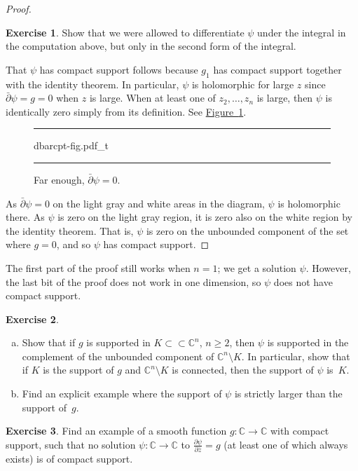 \documentclass[12pt,openany]{book}
\newcommand{\C}{{\mathbb{C}}}
\theoremstyle{plain}
\theoremstyle{remark}
\theoremstyle{definition}
\newenvironment{exbox}{%
    \def\FrameCommand{\vrule width 1pt \relax\hspace{10pt}}%
    \MakeFramed{\advance\hsize-\width\FrameRestore}%
}{%
    \endMakeFramed
}
\newenvironment{exparts}{%
    \leavevmode\begin{enumerate}[a),noitemsep,topsep=0pt,parsep=0pt,partopsep=0pt]
}{%
    \end{enumerate}
}
\newenvironment{myfig}{%
\begin{figure}[h!t]
\noindent\rule{\textwidth}{0.5pt}\vspace{12pt}\par\centering}%
{\par\noindent\rule{\textwidth}{0.5pt}
\end{figure}}
\theoremstyle{exercise}
\newtheorem{exercise}{Exercise}[section]
\theoremstyle{example}
\newcommand{\figureref}[1]{\hyperref[#1]{Figure~\ref*{#1}}}
\begin{document}
\begin{proof}
\begin{exbox}
\begin{exercise}
Show that we were allowed to differentiate $\psi$
under the integral in the computation above, but only in the second form
of the integral.
\end{exercise}
\end{exbox}

That $\psi$ has compact support follows because $g_1$ has compact
support together with the identity theorem.  In particular, $\psi$ is
holomorphic for large $z$ since $\bar{\partial} \psi = g = 0$ when $z$
is large.  When at least one of $z_2,\ldots,z_n$ is large,
then $\psi$ is identically zero
simply from its definition.  See \figureref{fig:dbarcpt-fig}.

\begin{myfig}
{dbarcpt-fig.pdf_t}
\caption{Far enough, $\bar{\partial} \psi = 0$.\label{fig:dbarcpt-fig}}
\end{myfig}

As $\bar{\partial} \psi = 0$ on the light gray and white areas in the
diagram, $\psi$ is holomorphic there. As $\psi$ is zero on the light
gray region, it is zero also on the white region by the identity theorem.
That is, $\psi$ is zero on the unbounded component of the set where $g=0$,
and so $\psi$ has compact support.
\end{proof}

The first part of the proof still works when $n=1$; we get a solution
$\psi$.  However, the last bit of the proof does not work in one dimension, so
$\psi$ does not have compact support.

\begin{exbox}
\begin{exercise} \label{exercise:supportofpsi}
\begin{exparts}
\item
Show that if $g$ is supported in $K \subset \subset \C^n$, $n \geq 2$,
then $\psi$ is supported in the complement of the unbounded component
of $\C^n \setminus K$.  In particular, show that if $K$ is the support of
$g$ and $\C^n \setminus K$ is connected, then the support of
$\psi$ is~$K$.
\item
Find an explicit example where the support of $\psi$ is strictly larger
than the support of~$g$.
\end{exparts}
\end{exercise}

\begin{exercise}
Find an example of a smooth function $g \colon \C \to \C$ with compact
support, such that no solution $\psi \colon \C \to \C$ to
$\frac{\partial \psi}{\partial \bar{z}} = g$ (at least one of which always exists) is
of compact support.
\end{exercise}
\end{exbox}
\end{document}
